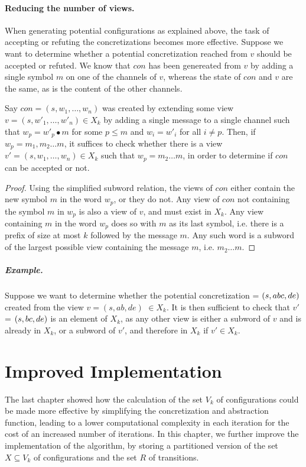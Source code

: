 \paragraph{Reducing the number of views.}
When generating potential configurations as explained above, the task of accepting or refuting the concretizations becomes more effective.  
Suppose we want to determine whether a potential concretization  reached from $v$ should be accepted or refuted. We know that $con$ has been genereated from $v$ by adding a single symbol $m$ on one of the channels of $v$, whereas the state of $con$ and $v$ are the same, as is the content of the other channels.

\begin{lemma}
Say $con = (s, w_1, \ldots, w_n)$ was created by extending some view $v = (s, w'_1, \ldots, w'_n) \in X_k$ by adding a single message to a single channel such that $w_p = w'_p \bullet m$ for some $p\leq m$ and $w_i = w'_i$ for all $i \neq p$. Then, if $w_p = m_1, m_2 \ldots m$, it suffices to check whether there is a view $v' = (s, w_1, \ldots, w_n) \in X_k$ such that $w_p = m_2\ldots m$, in order to determine if $con$ can be accepted or not.
\end{lemma}

\begin{proof}
Using the simplified subword relation, the views of $con$ either contain the new symbol $m$ in the word $w_p$, or they do not. Any view of $con$ not containing the symbol $m$ in $w_p$ is also a view of $v$, and must exist in $X_k$. Any view containing $m$ in the word $w_p$ does so with $m$ as its last symbol, i.e. there is a prefix of size at most $k$ followed by the message $m$. Any such word is a subword of the largest possible view containing the message $m$, i.e. $m_2\ldots m$.

\end{proof}


\subparagraph{Example.} Suppose we want to determine whether the potential concretization  = $(s, abc, de)$ created from the view $v = (s, ab, de)$ $\in X_k$. It is then sufficient to check that $v'$ = $(s,bc,de)$ is an element of $X_k$, as any other view is either a subword of $v$ and is already in $X_k$, or a subword of $v'$, and therefore in $X_k$ if $v' \in X_k$.

\newpage
\section{Improved Implementation}
The last chapter showed how the calculation of the set $V_k$ of configurations could be made more effective by simplifying the concretization and abstraction function, leading to a lower computational complexity in each iteration for the cost of an increased number of iterations. In this chapter, we further improve the implementation of the algorithm, by storing a partitioned version of the set $X \subseteq V_k$ of configurations and the set $R$ of transitions.

